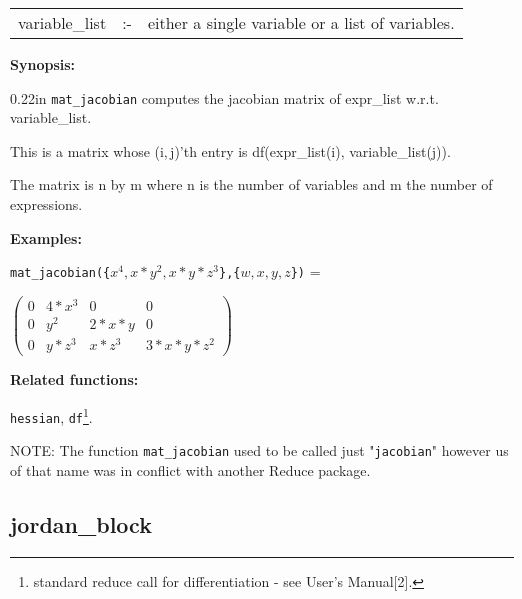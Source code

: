 \vspace*{0.04in}
\hspace*{0.1in}
\begin{tabular}{l l l}
variable\_list &:-& either a single variable or a list of variables.
\end{tabular}

{\bf Synopsis:} %

\begin{addtolength}{\leftskip}{0.22in}
{\tt mat\_jacobian} computes the jacobian matrix of expr\_list w.r.t. 
variable\_list. 

This is a matrix whose (i,$\,$j)'th entry is df(expr\_list(i),
variable\_list(j)).

The matrix is n by m where n is the 
                number of variables and m the number of expressions.

\end{addtolength}

{\bf Examples:}

\hspace*{0.175in} 
{\tt mat\_jacobian(\{$x^4,x*y^2,x*y*z^3$\},\{$w,x,y,z$\})} = 

\vspace*{0.1in}

\begin{flushleft}  
\hspace*{0.175in}
\begin{math}        
\left( \begin{array}{cccc} 0 & 4*x^3 & 0 & 0 \\ 0 & y^2 & 2*x*y & 0 \\ 
0 & y*z^3 & x*z^3 & 3*x*y*z^2 
\end{array} \right)
\end{math}  
\end{flushleft}

{\bf Related functions:}

\hspace*{0.175in} {\tt hessian}, {\tt df}\footnote{standard reduce call 
for differentiation - see {\REDUCE} User's Manual[2].}.

NOTE: The function \texttt{mat\_jacobian} used to be called just "\texttt{jacobian}"
however us of that name was in conflict with another Reduce package.


\subsection{jordan\_block}

